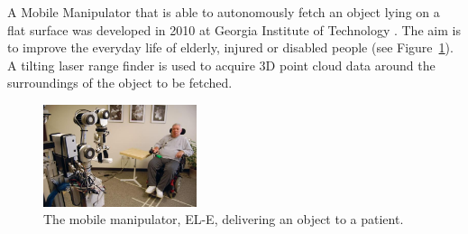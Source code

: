         A Mobile Manipulator that is able to autonomously fetch an object lying on a flat surface was developed in 2010 at Georgia Institute of Technology \cite{jain2010assistive}. The aim is to improve the everyday life of elderly, injured or disabled people (see Figure~\ref{fig:AssistiveManipulator}). A tilting laser range finder is used to acquire 3D point cloud data around the surroundings of the object to be fetched.

        \begin{figure}[h]
        \includegraphics[width=0.4\textwidth]{AssistiveManipulator.jpg}
        \centering
        \caption{The mobile manipulator, EL-E, delivering an object to a patient.}
        \label{fig:AssistiveManipulator}
        \end{figure}

\clearpage 